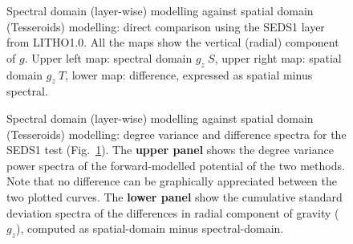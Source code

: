\begin{subappendices}
\begin{figure} %
    \begin{adjustbox}{center}
    \end{adjustbox}
    \caption[Spectral domain modelling against spatial domain modelling: SEDS1 test, direct comparison of $g_z$.]{Spectral domain (layer-wise) modelling against spatial domain (Tesseroids) modelling: direct comparison using the {SEDS1} layer from {LITHO1.0}.
    All the maps show the vertical (radial) component of $g$.
    Upper left map: spectral domain $g_z \ S$, upper right map: spatial domain $g_z \ T$, lower map: difference, expressed as spatial minus spectral.}
    \label{fig:SpatSpecComp:SEDS1_g_maps}
\end{figure}

\begin{figure} %
    \begin{adjustbox}{center}
    \end{adjustbox}
    \caption[Spectral domain modelling against spatial domain modelling: degree variance and difference spectra (SEDS1 test).]{
        Spectral domain (layer-wise) modelling against spatial domain (Tesseroids) modelling: degree variance and difference spectra for the SEDS1 test (Fig.~\ref{fig:SpatSpecComp:SEDS1_g_maps}).
        The \textbf{upper panel} shows the degree variance power spectra of the forward-modelled potential of the two methods.
        Note that no difference can be graphically appreciated between the two plotted curves.
        The \textbf{lower panel} show the cumulative standard deviation spectra of the differences in radial component of gravity ($g_z$), computed as spatial-domain minus spectral-domain.
    }
    \label{fig:SpatSpecComp:SEDS1_dv_spec}
\end{figure}


\end{subappendices}
